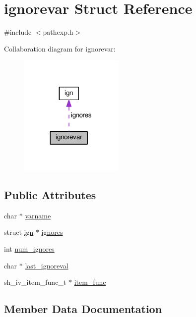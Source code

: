 \hypertarget{structignorevar}{}\section{ignorevar Struct Reference}
\label{structignorevar}


{\ttfamily \#include $<$pathexp.\+h$>$}



Collaboration diagram for ignorevar\+:
\nopagebreak
\begin{figure}[H]
\begin{center}
\leavevmode
\includegraphics[width=143pt]{structignorevar__coll__graph}
\end{center}
\end{figure}
\subsection*{Public Attributes}
\begin{DoxyCompactItemize}
\item 
char $\ast$ \hyperlink{structignorevar_ab13e47d0a13f6a8664a45472d22fb4c3}{varname}
\item 
struct \hyperlink{structign}{ign} $\ast$ \hyperlink{structignorevar_a4df6df8420b250d65d0fc25f30f60adc}{ignores}
\item 
int \hyperlink{structignorevar_a95a5f4f22d35923944fb9b4c8f0ba209}{num\+\_\+ignores}
\item 
char $\ast$ \hyperlink{structignorevar_a579abbc7ef7ac4a590ae52545bd8b43f}{last\+\_\+ignoreval}
\item 
sh\+\_\+iv\+\_\+item\+\_\+func\+\_\+t $\ast$ \hyperlink{structignorevar_ade27d1004f266495c1229b154f24e1cf}{item\+\_\+func}
\end{DoxyCompactItemize}


\subsection{Member Data Documentation}
